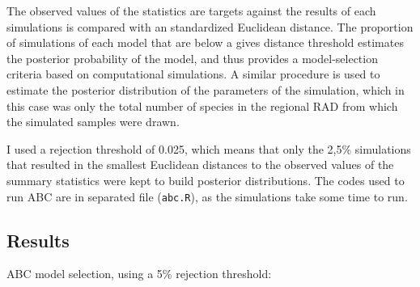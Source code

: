 \documentclass[12pt, A4]{article}\usepackage[]{graphicx}\usepackage[]{color}
\newcommand{\code}[1]{\texttt{#1}}
\begin{document}
The observed values of the statistics are targets against the results of each simulations is compared with an standardized
Euclidean distance. The proportion of simulations of each model that are below a gives distance threshold estimates the
posterior probability of the model, and thus provides a model-selection criteria based on computational simulations.
A similar procedure is used to estimate the posterior distribution of the parameters of the simulation, which in this case
was only the total number of species in the regional RAD from which the simulated samples were drawn.

I used a rejection threshold of 0.025, which means that only the 2,5\% simulations that resulted in the smallest Euclidean
distances to the observed values of the summary statistics were kept to build posterior distributions.
The codes used to run ABC are in separated file (\code{abc.R}), as the simulations take some time to run.


\subsection*{Results}

ABC model selection, using a 5\% rejection threshold:
\end{document}

